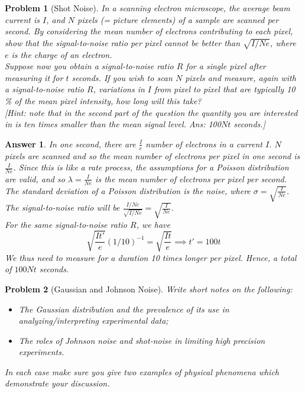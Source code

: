 \documentclass[a4paper]{article}
\newtheorem{ans}{Answer}[section]
\theoremstyle{new}
\newtheorem{qns}{Problem}[section]
\begin{document}
\begin{qns}[Shot Noise]
In a scanning electron microscope, the average beam current is $I$, and $N$ pixels (= picture elements) of a sample are scanned per second. By considering the mean number of electrons contributing to each pixel, show that the signal-to-noise ratio per pixel cannot be better than $\sqrt{I/Ne}$, where $e$ is the charge of an electron.\\[5pt]
Suppose now you obtain a signal-to-noise ratio $R$ for a single pixel after measuring it for $t$ seconds. If you wish to scan $N$ pixels and measure, again with a signal-to-noise ratio $R$,
variations in $I$ from pixel to pixel that are typically 10 \% of the mean pixel intensity, how long will this take?\\[5pt]
[Hint: note that in the second part of the question the quantity you are interested in is ten times smaller than the mean signal level. Ans: 100$Nt$ seconds.]
\end{qns}
\begin{ans}
In one second, there are $\frac{I}{e}$ number of electrons in a current $I$. $N$ pixels are scanned and so the mean number of electrons per pixel in one second is $\frac{I}{Ne}$. Since this is like a rate process, the assumptions for a Poisson distribution are valid, and so $\lambda=\frac{I}{Ne}$ is the mean number of electrons per pixel per second. The standard deviation of a Poisson distribution is the noise, where $\sigma=\sqrt{\frac{I}{Ne}}$. The signal-to-noise ratio will be $\frac{I/Ne}{\sqrt{I/Ne}}=\sqrt{\frac{I}{Ne}}$.\\[5pt]
For the same signal-to-noise ratio $R$, we have
$$\sqrt{\frac{It'}{e}}(1/10)^{-1}=\sqrt{\frac{It}{e}}\implies t'=100t$$
We thus need to measure for a duration 10 times longer per pixel. Hence, a total of $100 Nt$ seconds.
\end{ans}
\begin{qns}[Gaussian and Johnson Noise]
Write short notes on the following:
\begin{itemize}
    \item The Gaussian distribution and the prevalence of its use in analyzing/interpreting experimental data;
    \item The roles of Johnson noise and shot-noise in limiting high precision experiments.
\end{itemize}
In each case make sure you give two examples of physical phenomena which demonstrate your discussion.
\end{qns}
\end{document}
